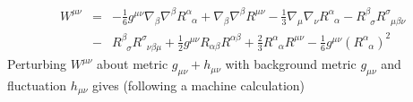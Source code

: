 \documentclass[10pt,letterpaper]{article}
\begin{document}
\begin{eqnarray}
W^{\mu \nu}&=&
-\frac{1}{6}g^{\mu\nu}\nabla_{\beta}\nabla^{\beta}R^{\alpha}_{\phantom{\alpha}\alpha}
+\nabla_{\beta}\nabla^{\beta}R^{\mu\nu}                    
 -\frac{1}{3}\nabla_{\mu}\nabla_{\nu}R^{\alpha}_{\phantom{\alpha}\alpha}  
 -R^{\beta}_{\phantom{\beta}\sigma} R^{\sigma}_{\phantom{\sigma}\mu\beta\nu}   
  \nonumber\\
 &-&R^{\beta}_{\phantom{\beta}\sigma} R^{\sigma}_{\phantom{\sigma}\nu\beta\mu}  
+\frac{1}{2}g^{\mu\nu}R_{\alpha\beta}R^{\alpha\beta}                                            
+\frac{2}{3}R^{\alpha}_{\phantom{\alpha}\alpha}R^{\mu\nu}                              
-\frac{1}{6}g^{\mu\nu}(R^{\alpha}_{\phantom{\alpha}\alpha})^2
\label{AP42}
\end{eqnarray}                                 
%
Perturbing $W^{\mu\nu}$ about metric $g_{\mu\nu}+h_{\mu\nu}$ with background metric $g_{\mu\nu}$ and fluctuation $h_{\mu\nu}$ gives (following a machine calculation)
\end{document}
